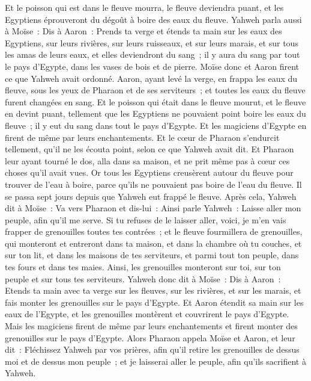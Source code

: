 \begin{multicols}{2}
Et le poisson qui est dans le fleuve mourra, le fleuve deviendra puant, et les Egyptiens éprouveront du dégoût à boire des eaux du fleuve.
Yahweh parla aussi à Moïse~: Dis à Aaron~: Prends ta verge et étends ta main sur les eaux des Egyptiens, sur leurs rivières, sur leurs ruisseaux, et sur leurs marais, et sur tous les amas de leurs eaux, et elles deviendront du sang~; il y aura du sang par tout le pays d'Egypte, dans les vases de bois et de pierre.
Moïse donc et Aaron firent ce que Yahweh avait ordonné. Aaron, ayant levé la verge, en frappa les eaux du fleuve, sous les yeux de Pharaon et de ses serviteurs~; et toutes les eaux du fleuve furent changées en sang.
Et le poisson qui était dans le fleuve mourut, et le fleuve en devint puant, tellement que les Egyptiens ne pouvaient point boire les eaux du fleuve~; il y eut du sang dans tout le pays d'Egypte.
Et les magiciens d'Egypte en firent de même par leurs enchantements. Et le cœur de Pharaon s'endurcit tellement, qu'il ne les écouta point, selon ce que Yahweh avait dit.
Et Pharaon leur ayant tourné le dos, alla dans sa maison, et ne prit même pas à cœur ces choses qu'il avait vues.
Or tous les Egyptiens creusèrent autour du fleuve pour trouver de l'eau à boire, parce qu'ils ne pouvaient pas boire de l'eau du fleuve.
Il se passa sept jours depuis que Yahweh eut frappé le fleuve.
Après cela, Yahweh dit à Moïse~: Va vers Pharaon et dis-lui~: Ainsi parle Yahweh~: Laisse aller mon peuple, afin qu'il me serve.
Si tu refuses de le laisser aller, voici, je m'en vais frapper de grenouilles toutes tes contrées~;
et le fleuve fourmillera de grenouilles, qui monteront et entreront dans ta maison, et dans la chambre où tu couches, et sur ton lit, et dans les maisons de tes serviteurs, et parmi tout ton peuple, dans tes fours et dans tes maies.
Ainsi, les grenouilles monteront sur toi, sur ton peuple et sur tous tes serviteurs.
\VerseOne{}Yahweh donc dit à Moïse~: Dis à Aaron~: Etends ta main avec ta verge sur les fleuves, sur les rivières, et sur les marais, et fais monter les grenouilles sur le pays d'Egypte.
Et Aaron étendit sa main sur les eaux de l'Egypte, et les grenouilles montèrent et couvrirent le pays d'Egypte.
Mais les magiciens firent de même par leurs enchantements et firent monter des grenouilles sur le pays d'Egypte.
Alors Pharaon appela Moïse et Aaron, et leur dit~: Fléchissez Yahweh par vos prières, afin qu'il retire les grenouilles de dessus moi et de dessus mon peuple~; et je laisserai aller le peuple, afin qu'ils sacrifient à Yahweh.

\end{multicols}
